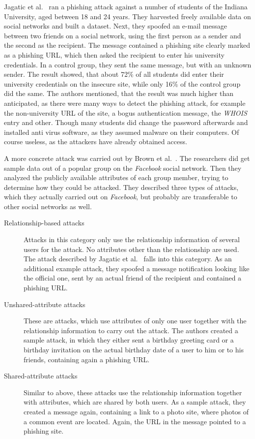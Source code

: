 Jagatic et al.~\cite{jagatic2007} ran a phishing attack against a number of
students of the Indiana University, aged between 18 and 24 years. They
harvested freely available data on social networks and built a dataset. Next,
they spoofed an e-mail message between two friends on a social network, using
the first person as a sender and the second as the recipient.  The message
contained a phishing site clearly marked as a phishing URL, which then asked
the recipient to enter his university credentials. In a control group, they
sent the same message, but with an unknown sender. The result showed, that
about 72\% of all students did enter their university credentials on the
insecure site, while only 16\% of the control group did the same. The authors
mentioned, that the result was much higher than anticipated, as there were many
ways to detect the phishing attack, for example the non-university URL of the
site, a bogus authentication message, the \textit{WHOIS} entry and other.
Though many students did change the password afterwards and installed anti
virus software, as they assumed malware on their computers. Of course useless,
as the attackers have already obtained access.

A more concrete attack was carried out by Brown et al.~\cite{brown2008}. The
researchers did get sample data out of a popular group on the \textit{Facebook}
social network. Then they analyzed the publicly available attributes of each
group member, trying to determine how they could be attacked. They described
three types of attacks, which they actually carried out on \textit{Facebook},
but probably are transferable to other social networks as well. 

\begin{description}
\item[Relationship-based attacks]
Attacks in this category only use the relationship information of several
users for the attack. No attributes other than the relationship are used. The
attack described by Jagatic et al.~\cite{jagatic2007} falls into this category. As an
additional example attack, they spoofed a message notification looking like the
official one, sent by an actual friend of the recipient and contained a
phishing URL.

\item[Unshared-attribute attacks]
These are attacks, which use attributes of only one user together
with the relationship information to carry out the attack. The authors created
a sample attack, in which they either sent a birthday greeting card or a
birthday invitation on the actual birthday date of a user to him or to his
friends, containing again a phishing URL.

\item[Shared-attribute attacks]
Similar to above, these attacks use the relationship information together with
attributes, which are shared by both users. As a sample attack, they created
a message again, containing a link to a photo site, where photos of a common
event are located. Again, the URL in the message pointed to a phishing site.
\end{description}

